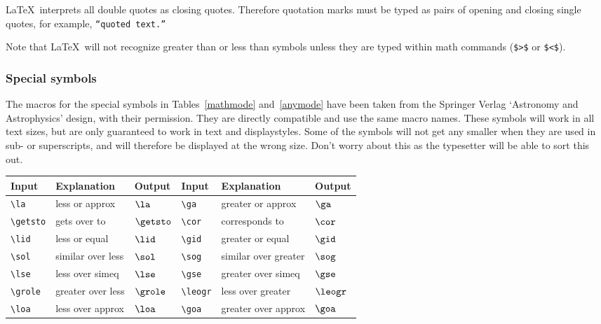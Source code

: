 \LaTeX\ interprets all double quotes as closing quotes. Therefore quotation
marks must be typed as pairs of opening and closing single quotes, for example,
\texttt{``quoted text.''}

Note that \LaTeX\ will not recognize greater than or less than symbols unless
they are typed within math commands (\verb"$>$" or \verb"$<$").

\subsubsection{Special symbols}

The macros for the special symbols in Tables~\ref{mathmode} and~\ref{anymode}
have been taken from the Springer Verlag `Astronomy and Astrophysics' design,
with their permission. They are directly compatible and use the same macro
names. These symbols will work in all text sizes, but are only guaranteed to
work in text and displaystyles. Some of the symbols will not get any smaller
when they are used in sub- or superscripts, and will therefore be displayed at
the wrong size. Don't worry about this as the typesetter will be able to sort
this out.
%
\begin{table*}
\begin{minipage}{106mm}
\caption{Special symbols which can only be used in math mode.}\label{mathmode}
\begin{tabular}{@{}llllll}
Input & Explanation & Output & Input & Explanation & Output\\
\toprule
\verb"\la"     & less or approx       & $\la$     &
\verb"\ga"     & greater or approx    & $\ga$\\[2pt]
\verb"\getsto" & gets over to         & $\getsto$ &
\verb"\cor"    & corresponds to       & $\cor$\\[2pt]
\verb"\lid"    & less or equal        & $\lid$    &
\verb"\gid"    & greater or equal     & $\gid$\\[2pt]
\verb"\sol"    & similar over less    & $\sol$    &
\verb"\sog"    & similar over greater & $\sog$\\[2pt]
\verb"\lse"    & less over simeq      & $\lse$    &
\verb"\gse"    & greater over simeq   & $\gse$\\[2pt]
\verb"\grole"  & greater over less    & $\grole$  &
\verb"\leogr"  & less over greater    & $\leogr$\\[2pt]
\verb"\loa"    & less over approx     & $\loa$    &
\verb"\goa"    & greater over approx  & $\goa$\\
\bottomrule
\end{tabular}
\end{minipage}
\end{table*}
